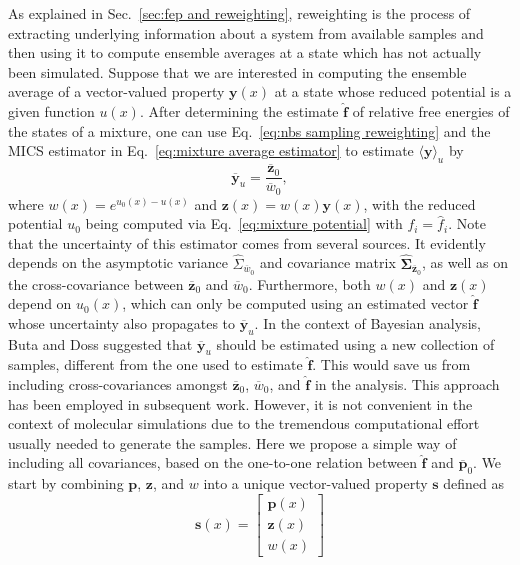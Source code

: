 \documentclass[aip,jcp,reprint,amsmath,amssymb]{revtex4-1}
\newcommand{\mt}[1]{\boldsymbol{\mathbf{#1}}}           %
\newcommand{\vt}[1]{\boldsymbol{\mathbf{#1}}}           %
\begin{document}
As explained in Sec.~\ref{sec:fep and reweighting}, reweighting is the process of extracting underlying information about a system from available samples and then using it to compute ensemble averages at a state which has not actually been simulated. Suppose that we are interested in computing the ensemble average of a vector-valued property $\vt y(x)$ at a state whose reduced potential is a given function $u(x)$. After determining the estimate $\hat{\vt f}$ of relative free energies of the states of a mixture, one can use Eq.~\eqref{eq:nbs sampling reweighting} and the MICS estimator in Eq.~\eqref{eq:mixture average estimator} to estimate $\langle \vt y \rangle_u$ by
\begin{equation}
\label{eq:reweighting from mixture}
\overline{\vt y}_u = \frac{\overline{\vt z}_0}{\overline{w}_0},
\end{equation}
where $w(x) = e^{u_0(x) - u(x)}$ and ${\vt z}(x) = w(x) {\vt y}(x)$, with the reduced potential $u_0$ being computed via Eq.~\eqref{eq:mixture potential} with $f_i = {\hat f}_i$. Note that the uncertainty of this estimator comes from several sources. It evidently depends on the asymptotic variance $\hat \Sigma_{\overline w_0}$ and covariance matrix $\hat{\mt \Sigma}_{\overline{\vt z}_0}$, as well as on the cross-covariance between $\overline{\vt z}_0$ and $\overline w_0$. Furthermore, both $w(x)$ and $\vt z(x)$ depend on $u_0(x)$, which can only be computed using an estimated vector $\hat{\vt f}$ whose uncertainty also propagates to $\overline{\vt y}_u$. In the context of Bayesian analysis, Buta and Doss\cite{Buta_2011} suggested that $\overline{\vt y}_u$ should be estimated using a new collection of samples, different from the one used to estimate $\hat{\vt f}$. This would save us from including cross-covariances amongst $\overline{\vt z}_0$, $\overline w_0$, and $\hat{\vt f}$ in the analysis. This approach has been employed in subsequent work.\cite{Tan_2015, Roy_2018} However, it is not convenient in the context of molecular simulations due to the tremendous computational effort usually needed to generate the samples. Here we propose a simple way of including all covariances, based on the one-to-one relation between $\hat{\vt f}$ and $\overline{\vt p}_0$. We start by combining $\vt p$, $\vt z$, and $w$ into a unique vector-valued property $\vt s$ defined as
\begin{equation*}
\vt s(x) = \left[\begin{array}{c}
\vt p(x) \\
\vt z(x) \\ w(x)
\end{array}\right]
\end{equation*}
\end{document}
